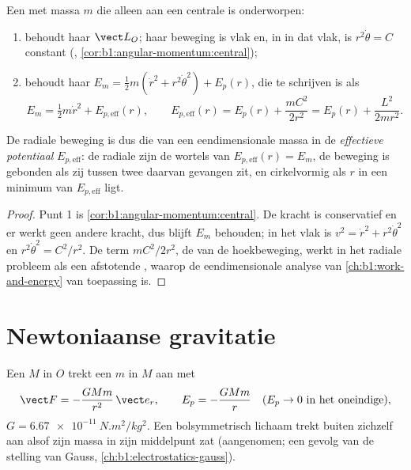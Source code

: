 \begin{theorem}\label{thm:b1:central-forces:reduction}
Een  met massa $m$ die alleen aan een centrale  is onderworpen:
\begin{enumerate}
  \item behoudt haar  $\vect L_O$; haar beweging is vlak en,
        in  in dat vlak, is $r^2\dot\theta = C$
        constant (, \cref{cor:b1:angular-momentum:central});
  \item behoudt haar  $E_m = \tfrac12 m(\dot r^2 + r^2\dot\theta^2)
        + E_p(r)$, die te schrijven is als
        \[
        E_m = \tfrac12 m\dot r^2 + E_{p,\mathrm{eff}}(r), \qquad
        E_{p,\mathrm{eff}}(r) = E_p(r) + \frac{mC^2}{2r^2} = E_p(r) + \frac{L^2}{2mr^2} .
        \]
\end{enumerate}
De radiale beweging is dus die van een eendimensionale massa in de
\emph{effectieve potentiaal} $E_{p,\mathrm{eff}}$: de radiale 
zijn de wortels van $E_{p,\mathrm{eff}}(r) = E_m$, de beweging is
gebonden als zij tussen twee daarvan gevangen zit, en cirkelvormig als $r$ in
een minimum van $E_{p,\mathrm{eff}}$ ligt.
\end{theorem}

\begin{proof}
Punt 1 is \cref{cor:b1:angular-momentum:central}. De kracht is
conservatief en er werkt geen andere kracht, dus blijft $E_m$ behouden; in het
vlak is $v^2 = \dot r^2 + r^2\dot\theta^2$ en $r^2\dot\theta^2 = C^2/r^2$.
De term $mC^2/2r^2$, de  van de hoekbeweging, werkt in het
radiale probleem als een afstotende \emph{}, waarop de
eendimensionale analyse van \cref{ch:b1:work-and-energy} van toepassing is.
\end{proof}

\section{Newtoniaanse gravitatie}

\begin{definition}\label{def:b1:central-forces:gravitation}
Een  $M$ in $O$ trekt een  $m$ in $M$ aan met
\[
\vect F = -\frac{GMm}{r^2}\,\vect e_r, \qquad E_p = -\frac{GMm}{r} \quad (E_p \to 0 \text{ in het oneindige}),
\]
$G = \qty{6.67e-11}{N.m^2/kg^2}$. Een bolsymmetrisch lichaam trekt buiten
zichzelf aan alsof zijn massa in zijn middelpunt zat (aangenomen; een
gevolg van de stelling van Gauss, \cref{ch:b1:electrostatics-gauss}).
\end{definition}

